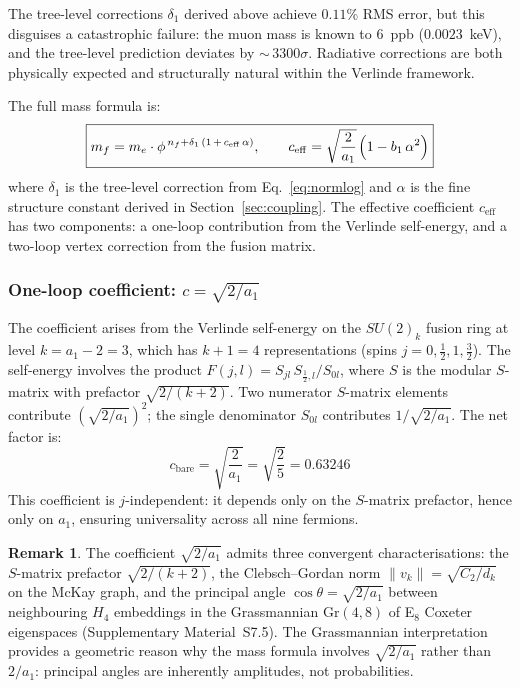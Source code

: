 \documentclass[12pt,a4paper]{article}
\theoremstyle{definition}
\newtheorem{remark}{Remark}
\begin{document}
The tree-level corrections $\delta_1$ derived above achieve $0.11\%$ RMS error, but this disguises a catastrophic failure: the muon mass is known to $6$~ppb ($0.0023$~keV), and the tree-level prediction deviates by ${\sim}\,3300\sigma$.  Radiative corrections are both physically expected and structurally natural within the Verlinde framework.

The full mass formula is:
\begin{equation}
\boxed{m_f = m_e \cdot \phi^{\,n_f + \delta_1\,(1 \,+\, c_{\mathrm{eff}}\,\alpha)}, \qquad c_{\mathrm{eff}} = \sqrt{\frac{2}{a_1}}\;\!\Bigl(1 - b_1\,\alpha^2\Bigr)}
\label{eq:oneloop}
\end{equation}
where $\delta_1$ is the tree-level correction from Eq.~\eqref{eq:normlog} and $\alpha$ is the fine structure constant derived in Section~\ref{sec:coupling}.  The effective coefficient $c_{\mathrm{eff}}$ has two components: a one-loop contribution from the Verlinde self-energy, and a two-loop vertex correction from the fusion matrix.

\subsubsection*{One-loop coefficient: $c = \sqrt{2/a_1}$}

The coefficient arises from the Verlinde self-energy on the $SU(2)_{k}$ fusion ring at level $k = a_1 - 2 = 3$, which has $k + 1 = 4$ representations (spins $j = 0, \tfrac{1}{2}, 1, \tfrac{3}{2}$).  The self-energy involves the product $F(j,l) = S_{jl}\,S_{\frac{1}{2},l}/S_{0l}$, where $S$ is the modular $S$-matrix with prefactor $\sqrt{2/(k+2)}$.  Two numerator $S$-matrix elements contribute $(\sqrt{2/a_1})^2$; the single denominator $S_{0l}$ contributes $1/\sqrt{2/a_1}$.  The net factor is:
\begin{equation}
c_{\mathrm{bare}} = \sqrt{\frac{2}{a_1}} = \sqrt{\frac{2}{5}} = 0.63246
\label{eq:cqed}
\end{equation}
This coefficient is $j$-independent: it depends only on the $S$-matrix prefactor, hence only on $a_1$, ensuring universality across all nine fermions.

\begin{remark}
The coefficient $\sqrt{2/a_1}$ admits three convergent characterisations: the $S$-matrix prefactor $\sqrt{2/(k{+}2)}$, the Clebsch--Gordan norm $\|v_k\| = \sqrt{C_2/d_k}$ on the McKay graph, and the principal angle $\cos\theta = \sqrt{2/a_1}$ between neighbouring $H_4$ embeddings in the Grassmannian $\mathrm{Gr}(4,8)$ of E$_8$ Coxeter eigenspaces (Supplementary Material~S7.5).  The Grassmannian interpretation provides a geometric reason why the mass formula involves $\sqrt{2/a_1}$ rather than $2/a_1$: principal angles are inherently amplitudes, not probabilities.
\end{remark}
\end{document}
